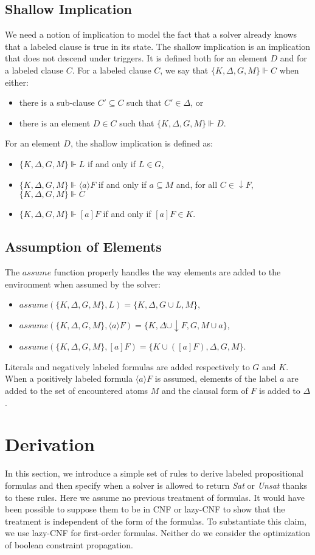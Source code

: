 \documentclass[a4paper,11pt]{article}
\newcommand{\A}{\mathit{assume}}
\begin{document}
\subsection{Shallow Implication}
We need a notion of implication to model the fact that a solver already knows that a labeled clause
is true in its state. The shallow implication is an implication that does not descend
under triggers. It is defined both for an element $D$ and for a labeled clause $C$.
For a labeled clause $C$, we say that $\{K,\Delta,G,M\}\Vdash C$ when either:
\begin{itemize}
 \item there is a sub-clause $C'\subseteq C$ such that $C'\in\Delta$, or
 \item there is an element $D\in C$ such that $\{K,\Delta,G,M\}\Vdash D$.
\end{itemize}
For an element $D$, the shallow implication is defined as:
\begin{itemize}
 \item $\{K,\Delta,G,M\}\Vdash L$ if and only if $L\in G$,
 \item $\{K,\Delta,G,M\}\Vdash\langle a\rangle F$ if and only if $a\subseteq M$ and, 
for all $C\in\downarrow F$, $\{K,\Delta,G,M\}\Vdash C$ 
 \item $\{K,\Delta,G,M\}\Vdash[a]F$ if and only if $[a]F\in K$.
\end{itemize}
\subsection{Assumption of Elements}
The $\A$ function properly handles the way elements are added to the environment when assumed
by the solver:
\begin{itemize}
 \item $\A(\{K,\Delta,G,M\},L)=\{K,\Delta,G\cup L,M\}$,
 \item $\A(\{K,\Delta,G,M\},\langle a\rangle F)=\{K,\Delta\cup\downarrow F,G,M\cup a\}$,
 \item $\A(\{K,\Delta,G,M\},[a]F)=\{K\cup([a]F),\Delta,G,M\}$.
\end{itemize}
Literals and negatively labeled formulas are added respectively to $G$ and $K$. When a positively
labeled formula $\langle a\rangle F$ is assumed, elements of the label $a$ are added to the
set of encountered atoms $M$ and the clausal form of $F$ is added to $\Delta$.
\section{Derivation}
In this section, we introduce a simple set of rules to derive labeled propositional formulas and then
specify when a solver is allowed to return \emph{Sat} or \emph{Unsat} thanks to these rules.
Here we assume no previous treatment of formulas. It would have been possible to suppose them to be in
CNF or lazy-CNF to show that the treatment is independent of the form of the formulas. To substantiate
this claim, we use lazy-CNF for first-order formulas. Neither do we
consider the optimization of boolean constraint propagation.
\end{document}
